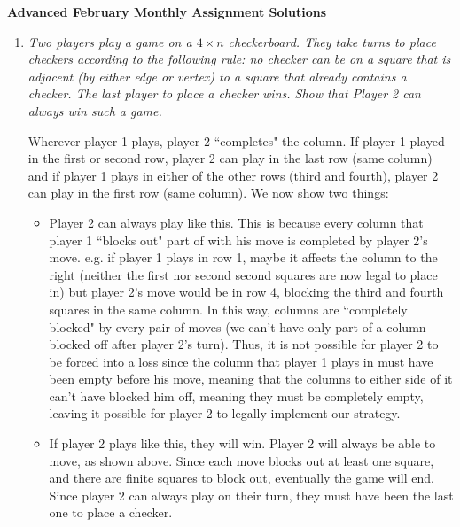 \documentclass{article}
\begin{document}
\thispagestyle{empty}

\begin{center}
  \textbf{\Large Advanced February Monthly Assignment Solutions}
\end{center}

\vspace{12pt}

\begin{enumerate}[1.]

\vspace{24pt}
\item %
{\itshape Two players play a game on a ${4\times n}$ checkerboard. They take turns to place checkers according to the following rule: no checker can be on a square that is adjacent (by either edge or vertex) to a square that already contains a checker. The last player to place a checker wins. Show that Player 2 can always win such a game.}

Wherever player 1 plays, player 2 ``completes" the column. If player 1 played in the first or second row, player 2 can play in the last row (same column) and if player 1 plays in either of the other rows (third and fourth), player 2 can play in the first row (same column). We now show two things:
\begin{itemize}
\item Player 2 can always play like this. This is because every column that player 1 ``blocks out" part of with his move is completed by player 2's move. e.g. if player 1 plays in row 1, maybe it affects the column to the right (neither the first nor second second squares are now legal to place in) but player 2's move would be in row 4, blocking the third and fourth squares in the same column. In this way, columns are ``completely blocked" by every pair of moves (we can't have only part of a column blocked off after player 2's turn). Thus, it is not possible for player 2 to be forced into a loss since the column that player 1 plays in must have been empty before his move, meaning that the columns to either side of it can't have blocked him off, meaning they must be completely empty, leaving it possible for player 2 to legally implement our strategy.
\item If player 2 plays like this, they will win. Player 2 will always be able to move, as shown above. Since each move blocks out at least one square, and there are finite squares to block out, eventually the game will end. Since player 2 can always play on their turn, they must have been the last one to place a checker.
\end{itemize}


\end{enumerate}
\end{document}
